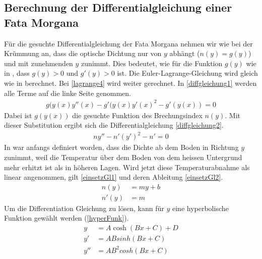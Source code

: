 \subsection{Berechnung der Differentialgleichung einer Fata Morgana \label{sec:diffgleichung}}
Für die gesuchte Differentialgleichung der Fata Morgana nehmen wir wie bei der Krümmung an, dass die optische Dichtung nur von $y$ abhängt ($n(y) = g(y)$) und mit zunehmenden $y$ zunimmt. Dies bedeutet, wie für die Funktion $g(y)$ wie in , dass $g(y) > 0$ und $g'(y) > 0 $ ist.
Die Euler-Lagrange-Gleichung wird gleich wie in  berechnet. Bei \eqref{lagrange4} wird weiter gerechnet. In \eqref{diffgleichung1} werden alle Terme auf die linke Seite genommen.
\begin{align}
	g(y(x) y''(x)-g'(y(x) y'(x)^2 - g'(y(x)) =0 
	\label{diffgleichung1}
\end{align}
Dabei ist $g(y(x))$ die gesuchte Funktion des Brechungsindex $n(y)$. Mit dieser Substitution ergibt sich die Differentialgleichung
\ref{diffgleichung2}.
\begin{align}
	n y''-n' (y')^2 - n' =0 
	\label{diffgleichung2}
\end{align}
In  war anfangs definiert worden, dass die Dichte ab dem Boden in Richtung $y$ zunimmt, weil die Temperatur über dem Boden von dem heissen Untergrund mehr erhitzt ist als in höheren Lagen. Wird jetzt diese Temperaturabnahme als linear angenommen, gilt \eqref{einsetzGl1} und deren Ableitung \eqref{einsetzGl2}.
\begin{align}
	n(y)&=my+b \label{einsetzGl1} \\
	n'(y)&=m \label{einsetzGl2}
\end{align}
Um die Differentiation Gleichung zu lösen, kann für $y$ eine hyperbolische Funktion \cite{cosh} gewählt werden (\eqref{hyperFunk}).
\begin{align}
	y&=A\cosh(Bx+C)+D \label{hyperFunk} \\
	y'&= A B sinh(B x + C) \label{hyperFunkDx} \\
	y''&= A B^2 cosh(B x + C) \label{hyperFunkD2x}
\end{align}

